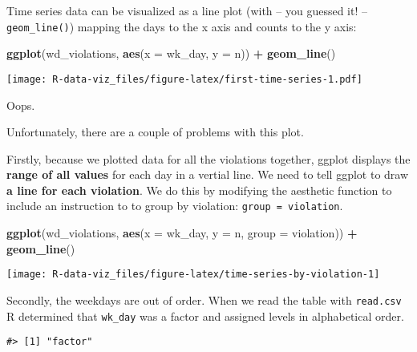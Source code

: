 \documentclass[]{book}
\newenvironment{Shaded}{\begin{snugshade}}{\end{snugshade}}
\newcommand{\DataTypeTok}[1]{\textcolor[rgb]{0.13,0.29,0.53}{#1}}
\newcommand{\KeywordTok}[1]{\textcolor[rgb]{0.13,0.29,0.53}{\textbf{#1}}}
\newcommand{\NormalTok}[1]{#1}
\newcommand{\OperatorTok}[1]{\textcolor[rgb]{0.81,0.36,0.00}{\textbf{#1}}}
\newcommand{\StringTok}[1]{\textcolor[rgb]{0.31,0.60,0.02}{#1}}
\begin{document}
Time series data can be visualized as a line plot (with -- you guessed it! -- \texttt{geom\_line()}) mapping the days to the x axis and counts to the y axis:

\begin{Shaded}
\begin{Highlighting}[]
\KeywordTok{ggplot}\NormalTok{(wd_violations, }\KeywordTok{aes}\NormalTok{(}\DataTypeTok{x =}\NormalTok{ wk_day, }\DataTypeTok{y =}\NormalTok{ n)) }\OperatorTok{+}
\StringTok{  }\KeywordTok{geom_line}\NormalTok{()}
\end{Highlighting}
\end{Shaded}

\texttt{[image: R-data-viz\_files/figure-latex/first-time-series-1.pdf]}

Oops.

Unfortunately, there are a couple of problems with this plot.

Firstly, because we plotted data for all the violations together, ggplot displays the \textbf{range of all values} for each day in a vertial line. We need to tell ggplot to draw \textbf{a line for each violation}. We do this by modifying the aesthetic function to include an instruction to to group by violation: \texttt{group\ =\ violation}.

\begin{Shaded}
\begin{Highlighting}[]
\KeywordTok{ggplot}\NormalTok{(wd_violations, }\KeywordTok{aes}\NormalTok{(}\DataTypeTok{x =}\NormalTok{ wk_day, }\DataTypeTok{y =}\NormalTok{ n, }\DataTypeTok{group =}\NormalTok{ violation)) }\OperatorTok{+}
\StringTok{  }\KeywordTok{geom_line}\NormalTok{()}
\end{Highlighting}
\end{Shaded}

\texttt{[image: R-data-viz\_files/figure-latex/time-series-by-violation-1]}

Secondly, the weekdays are out of order. When we read the table with \texttt{read.csv} R determined that \texttt{wk\_day} was a factor and assigned levels in alphabetical order.

\begin{Shaded}
\end{Shaded}

\begin{verbatim}
#> [1] "factor"
\end{verbatim}
\end{document}
